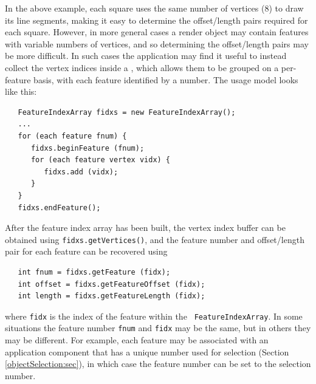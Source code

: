 In the above example, each square uses the same number of vertices (8)
to draw its line segments, making it easy to determine the
offset/length pairs required for each square. However, in more
general cases a render object may contain features with variable
numbers of vertices, and so determining the offset/length pairs
may be more difficult.  In
such cases the application may find it useful to instead collect the
vertex indices inside a ,
which allows them to be grouped on a per-feature basis, with each
feature identified by a number. The usage model looks like this:
%
\begin{lstlisting}
   FeatureIndexArray fidxs = new FeatureIndexArray();
   ...
   for (each feature fnum) {
      fidxs.beginFeature (fnum);
      for (each feature vertex vidx) {
         fidxs.add (vidx);
      }
   }
   fidxs.endFeature();   
\end{lstlisting}
%
After the feature index array has been built, the vertex index buffer
can be obtained using {\tt fidxs.getVertices()}, and the feature
number and offset/length pair for each feature can be recovered using
%
\begin{lstlisting}
   int fnum = fidxs.getFeature (fidx);
   int offset = fidxs.getFeatureOffset (fidx);
   int length = fidxs.getFeatureLength (fidx);
\end{lstlisting}
%
where {\tt fidx} is the index of the feature within the {\tt
FeatureIndexArray}. In some situations the feature number {\tt fnum}
and {\tt fidx} may be the same, but in others they may be different.
For example, each feature may be associated with an application
component that has a unique number used for selection (Section
\ref{objectSelection:sec}), in which case the feature number can be
set to the selection number.

